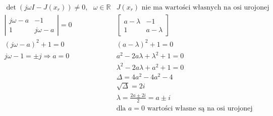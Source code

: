 $\begin{array}{ll}
\det(j\omega I-J(x_r)) \neq 0, \ \ \ \omega \in \mathbb{R} & J(x_r)\text{ nie ma wartości własnych na osi urojonej}\\
 \left| \begin{array}{cc}     j\omega-a& -1 \\ 1 & j\omega-a    \end{array}\right|=0 &  \left[ \begin{array}{cc}    a-\lambda & -1 \\ 1 & a- \lambda   \end{array}\right]\\
(j\omega-a)^2+1=0 & (a-\lambda)^2+1=0\\
j\omega-1= \pm j \Rightarrow \boxed{ a=0} & a^2-2a\lambda +\lambda^2+1 =0\\
&\lambda^2-2a\lambda+a^2+1 = 0\\
&\Delta=4a^2-4a^2-4\\
&\sqrt{\Delta}=2i\\
&\lambda=\frac{2a \pm 2i}{2} = a \pm i\\
&\text{dla } a=0 \text{ wartości własne są na osi urojonej}
\end{array}$\\


\pagebreak
